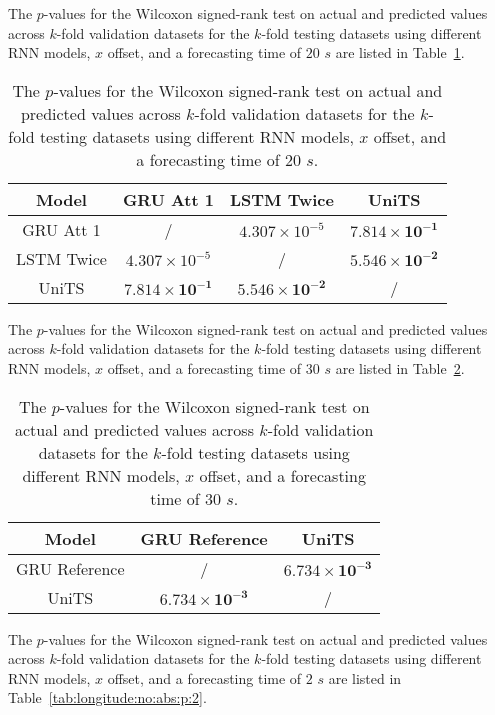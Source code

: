 The $p$-values for the Wilcoxon signed-rank test on actual and predicted values across $k$-fold validation datasets for the $k$-fold testing datasets using different RNN models, $x$ offset, and a forecasting time of $20$ $s$ are listed in Table~\ref{tab:longitude:no:abs:p:20}.

\begin{table}[!ht]
	\centering
	\begin{tabular}{|c|c|c|c|}
		\hline
		Model & GRU Att 1 & LSTM Twice & UniTS \\ \hline
		GRU Att 1 & / & $4.307 \times 10^{-5}$ & $\mathbf{7.814 \times 10^{-1}}$ \\ \hline
		LSTM Twice & $4.307 \times 10^{-5}$ & / & $\mathbf{5.546 \times 10^{-2}}$ \\ \hline
		UniTS & $\mathbf{7.814 \times 10^{-1}}$ & $\mathbf{5.546 \times 10^{-2}}$ & / \\ \hline
	\end{tabular}
	\caption{The $p$-values for the Wilcoxon signed-rank test on actual and predicted values across $k$-fold validation datasets for the $k$-fold testing datasets using different RNN models, $x$ offset, and a forecasting time of $20$ $s$.}
	\label{tab:longitude:no:abs:p:20}
\end{table}

The $p$-values for the Wilcoxon signed-rank test on actual and predicted values across $k$-fold validation datasets for the $k$-fold testing datasets using different RNN models, $x$ offset, and a forecasting time of $30$ $s$ are listed in Table~\ref{tab:longitude:no:abs:p:30}.

\begin{table}[!ht]
	\centering
	\begin{tabular}{|c|c|c|}
		\hline
		Model & GRU Reference & UniTS \\ \hline
		GRU Reference & / & $\mathbf{6.734 \times 10^{-3}}$ \\ \hline
		UniTS & $\mathbf{6.734 \times 10^{-3}}$ & / \\ \hline
	\end{tabular}
	\caption{The $p$-values for the Wilcoxon signed-rank test on actual and predicted values across $k$-fold validation datasets for the $k$-fold testing datasets using different RNN models, $x$ offset, and a forecasting time of $30$ $s$.}
	\label{tab:longitude:no:abs:p:30}
\end{table}

The $p$-values for the Wilcoxon signed-rank test on actual and predicted values across $k$-fold validation datasets for the $k$-fold testing datasets using different RNN models, $x$ offset, and a forecasting time of $2$ $s$ are listed in Table~\ref{tab:longitude:no:abs:p:2}.

